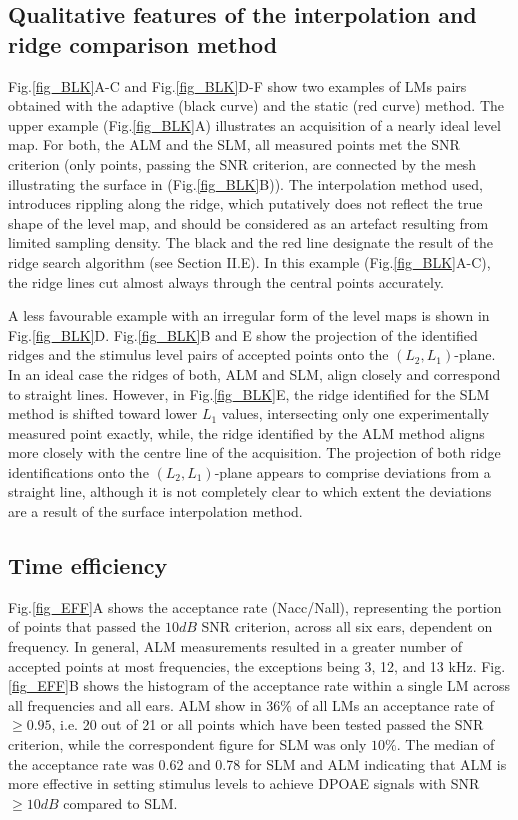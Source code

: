 \documentclass[journal,twoside,web]{ieeecolor2}
\begin{document}
\subsection{Qualitative features of the interpolation and ridge comparison method}
Fig.\ref{fig_BLK}A-C and Fig.\ref{fig_BLK}D-F show two examples of LMs pairs obtained with the adaptive (black curve) and the static (red curve) method. The upper example (Fig.\ref{fig_BLK}A) illustrates an acquisition of a nearly ideal level map. For both, the ALM and the SLM, all measured points met the SNR criterion (only points, passing the SNR criterion, are connected by the mesh illustrating the surface in (Fig.\ref{fig_BLK}B)). The interpolation method used, introduces rippling along the ridge, which putatively does not reflect the true shape of the level map, and should be considered as an artefact resulting from limited sampling density. The black and the red line designate the result of the ridge search algorithm (see Section II.E). In this example (Fig.\ref{fig_BLK}A-C), the ridge lines cut almost always through the central points accurately. 

A less favourable example with an irregular form of the level maps  is shown in Fig.\ref{fig_BLK}D. Fig.\ref{fig_BLK}B and E show the projection of the identified ridges and the stimulus level pairs of accepted points onto the $(L_2, L_1)$-plane. In an ideal case the ridges of both, ALM and SLM, align closely and correspond to straight lines. However, in Fig.\ref{fig_BLK}E,  the ridge identified for the SLM method is shifted toward lower $L_1$ values, intersecting only one experimentally measured point exactly, while, the ridge identified by the ALM method aligns more closely with the centre line of the acquisition. The projection of both ridge identifications onto the $(L_2, L_1)$-plane appears to comprise deviations from a straight line, although it is not completely clear to which extent the deviations are a result of the surface interpolation method.

\subsection{Time efficiency}
Fig.\ref{fig_EFF}A shows the acceptance rate (Nacc/Nall), representing the portion of points that passed the $10 dB$ SNR criterion, across all six ears, dependent on frequency. In general, ALM measurements resulted in a greater number of accepted points at most frequencies, the exceptions being 3, 12, and 13 kHz. Fig.\ref{fig_EFF}B shows the histogram of the acceptance rate within a single LM across all frequencies and all ears. ALM show in $36\%$ of all LMs an acceptance rate of $\ge 0.95$, i.e. 20 out of 21 or all points which have been tested passed the SNR criterion, while the correspondent figure for SLM was only $10\%$. The median of the acceptance rate was 0.62 and 0.78 for SLM and ALM indicating that ALM is more effective in setting stimulus levels to achieve DPOAE signals with SNR $\ge10 dB$ compared to SLM.
\end{document}
